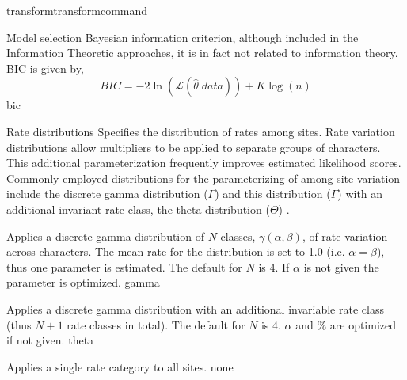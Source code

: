 \begin{command}{transform}{transformcommand}
\begin{arguments}
\begin {argumentgroup}{Model selection}
                { Bayesian information criterion, although included in
                the Information Theoretic approaches, it is in fact not
                related to information theory. BIC is given by,
                \begin{equation*}
                    BIC = - 2 \ln(\mathcal{L}(\hat{\theta}|data)) + K \log(n)
                \end{equation*}}
                {bic}
        \end{argumentgroup}


        \begin{argumentgroup}{Rate distributions}
            Specifies the distribution of rates among sites. Rate
            variation distributions allow multipliers to be applied to
            separate groups of characters. This additional parameterization
            frequently improves estimated likelihood scores.
            Commonly employed distributions for the parameterizing of 
            among-site variation include the discrete gamma distribution ($\Gamma$)
            \cite{yang1994a} and this distribution ($\Gamma$) with an additional
            invariant rate class, the theta distribution ($\Theta$)
            \cite{gu1995}. 
            

                {Applies a discrete gamma distribution of $N$ classes,
                $\gamma(\alpha,\beta)$, of rate variation across
                characters. The mean rate for the distribution is set to
                1.0 (i.e. $\alpha = \beta$), thus one parameter is
                estimated. The default for $N$ is 4. If $\alpha$ is
                not given the parameter is optimized.}
                {gamma}

                {Applies a discrete gamma distribution with an additional
                invariable rate class (thus $N+1$ rate classes in total).
                The default for $N$ is 4. $\alpha$ and \% are optimized if
                not given.}
                {theta}

                {Applies a single rate category to all sites.}
                {none}


\end{argumentgroup}
\end{arguments}
\end{command}
